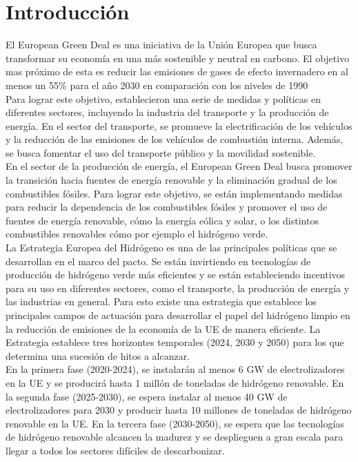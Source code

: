 
\chapter{Introducción}
\label{c1} %




El European Green Deal es una iniciativa de la Unión Europea que busca transformar su economía en una más sostenible y neutral en carbono. El objetivo mas próximo de esta es reducir las emisiones de gases de efecto invernadero en al menos un 55\% para el año 2030 en comparación con los niveles de 1990 \\

Para lograr este objetivo, establecieron una serie de medidas y políticas en diferentes sectores, incluyendo la industria del transporte y la producción de energía. En el sector del transporte, se promueve la electrificación de los vehículos y la reducción de las emisiones de los vehículos de combustión interna. Además, se busca fomentar el uso del transporte público y la movilidad sostenible.\\

En el sector de la producción de energía, el European Green Deal busca promover la transición hacia fuentes de energía renovable y la eliminación gradual de los combustibles fósiles. Para lograr este objetivo, se están implementando medidas para reducir la dependencia de los combustibles fósiles y promover el uso de fuentes de energía renovable, cómo la energía eólica y solar, o los distintos combustibles renovables cómo por ejemplo el hidrógeno verde.\\

La Estrategia Europea del Hidrógeno es una de las principales políticas que se desarrollan en el marco del pacto. Se están invirtiendo en tecnologías de producción de hidrógeno verde más eficientes y se están estableciendo incentivos para su uso en diferentes sectores, como el transporte, la producción de energía y las industrias en general. Para esto existe una estrategia que establece los principales campos de actuación para desarrollar el papel del hidrógeno limpio en la reducción de emisiones de la economía de la UE de manera eficiente. La Estrategia establece tres horizontes temporales (2024, 2030 y 2050) para los que determina una sucesión de hitos a alcanzar.\\

En la primera fase (2020-2024), se instalarán al menos 6 GW de electrolizadores en la UE y se producirá hasta 1 millón de toneladas de hidrógeno renovable. En la segunda fase (2025-2030), se espera instalar al menos 40 GW de electrolizadores para 2030 y producir hasta 10 millones de toneladas de hidrógeno renovable en la UE. En la tercera fase (2030-2050), se espera que las tecnologías de hidrógeno renovable alcancen la madurez y se desplieguen a gran escala para llegar a todos los sectores difíciles de descarbonizar.\\

